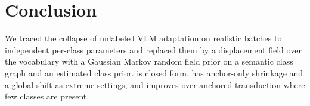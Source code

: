 \section{Conclusion}
\label{sec:conclusion}
We traced the collapse of unlabeled VLM adaptation on realistic batches to independent per-class parameters and replaced them by a displacement field over the vocabulary with a Gaussian Markov random field prior on a semantic class graph and an estimated class prior. \method is closed form, has anchor-only shrinkage and a global shift as extreme settings, and improves over anchored transduction where few classes are present.

